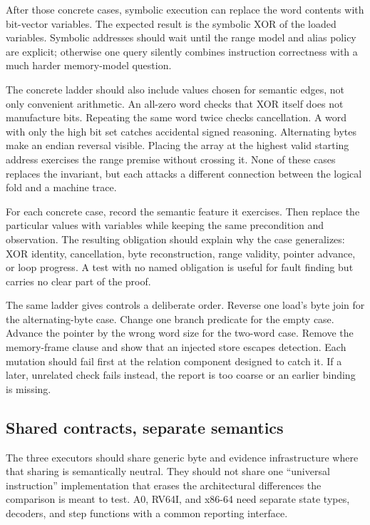 After those concrete cases, symbolic execution can replace the word contents
with bit-vector variables. The expected result is the symbolic XOR of the
loaded variables. Symbolic addresses should wait until the range model and
alias policy are explicit; otherwise one query silently combines instruction
correctness with a much harder memory-model question.

The concrete ladder should also include values chosen for semantic edges, not
only convenient arithmetic. An all-zero word checks that XOR itself does not
manufacture bits. Repeating the same word twice checks cancellation. A word
with only the high bit set catches accidental signed reasoning. Alternating
bytes make an endian reversal visible. Placing the array at the highest valid
starting address exercises the range premise without crossing it. None of
these cases replaces the invariant, but each attacks a different connection
between the logical fold and a machine trace.

\begin{proofkit}[title={From test ladder to proof obligations}]
For each concrete case, record the semantic feature it exercises. Then replace
the particular values with variables while keeping the same precondition and
observation. The resulting obligation should explain why the case generalizes:
XOR identity, cancellation, byte reconstruction, range validity, pointer
advance, or loop progress. A test with no named obligation is useful for fault
finding but carries no clear part of the proof.
\end{proofkit}

The same ladder gives controls a deliberate order. Reverse one load's byte
join for the alternating-byte case. Change one branch predicate for the empty
case. Advance the pointer by the wrong word size for the two-word case. Remove
the memory-frame clause and show that an injected store escapes detection.
Each mutation should fail first at the relation component designed to catch
it. If a later, unrelated check fails instead, the report is too coarse or an
earlier binding is missing.

\subsection{Shared contracts, separate semantics}

The three executors should share generic byte and evidence infrastructure
where that sharing is semantically neutral. They should not share one
``universal instruction'' implementation that erases the architectural
differences the comparison is meant to test. A0, RV64I, and x86-64 need
separate state types, decoders, and step functions with a common reporting
interface.

